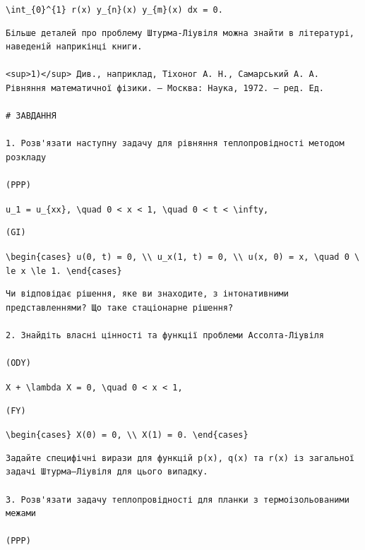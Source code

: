 \documentclass[
  ukrainian,
]{article}
\begin{document}
\texttt{\textbackslash{}int\_\{0\}\^{}\{1\}\ r(x)\ y\_\{n\}(x)\ y\_\{m\}(x)\ dx\ =\ 0.}

\begin{verbatim}
Більше деталей про проблему Штурма-Ліувіля можна знайти в літературі, наведеній наприкінці книги.

<sup>1)</sup> Див., наприклад, Тіхоног А. Н., Самарський А. А. Рівняння математичної фізики. — Москва: Наука, 1972. — ред. Ед.

# ЗАВДАННЯ

1. Розв'язати наступну задачу для рівняння теплопровідності методом розкладу

(PPP)
\end{verbatim}

\texttt{u\_1\ =\ u\_\{xx\},\ \textbackslash{}quad\ 0\ \textless{}\ x\ \textless{}\ 1,\ \textbackslash{}quad\ 0\ \textless{}\ t\ \textless{}\ \textbackslash{}infty,}

\begin{verbatim}
(GI)
\end{verbatim}

\texttt{\textbackslash{}begin\{cases\}\ u(0,\ t)\ =\ 0,\ \textbackslash{}\textbackslash{}\ u\_x(1,\ t)\ =\ 0,\ \textbackslash{}\textbackslash{}\ u(x,\ 0)\ =\ x,\ \textbackslash{}quad\ 0\ \textbackslash{}le\ x\ \textbackslash{}le\ 1.\ \textbackslash{}end\{cases\}}

\begin{verbatim}
Чи відповідає рішення, яке ви знаходите, з інтонативними представленнями? Що таке стаціонарне рішення?

2. Знайдіть власні цінності та функції проблеми Ассолта-Ліувіля

(ODY)
\end{verbatim}

\texttt{X\textquotesingle{}\ +\ \textbackslash{}lambda\ X\ =\ 0,\ \textbackslash{}quad\ 0\ \textless{}\ x\ \textless{}\ 1,}

\begin{verbatim}
(FY)
\end{verbatim}

\texttt{\textbackslash{}begin\{cases\}\ X(0)\ =\ 0,\ \textbackslash{}\textbackslash{}\ X\textquotesingle{}(1)\ =\ 0.\ \textbackslash{}end\{cases\}}

\begin{verbatim}
Задайте специфічні вирази для функцій p(x), q(x) та r(x) із загальної задачі Штурма–Ліувіля для цього випадку.

3. Розв'язати задачу теплопровідності для планки з термоізольованими межами

(PPP)
\end{verbatim}
\end{document}
